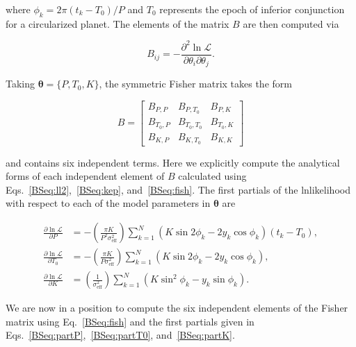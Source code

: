 \noindent where $\phi_k = 2\pi (t_k-T_0) / P$ and $T_0$ represents the epoch of inferior
conjunction for a circularized planet. The elements of the matrix $B$ are then computed via

\begin{equation}
  B_{ij} = -\frac{\partial^2 \ln{\mathcal{L}}}{\partial \theta_i \partial \theta_j}.
  \label{BSeq:fish}
\end{equation}

\noindent Taking $\boldsymbol{\theta}=\{P,T_0,K\}$, the symmetric Fisher matrix takes the
form

\begin{equation}
  B =
 \begin{bmatrix}
   B_{P,P} & B_{P,T_0} & B_{P,K} \\
   B_{T_0,P} & B_{T_0,T_0} & B_{T_0,K} \\
   B_{K,P} & B_{K,T_0} & B_{K,K} 
 \end{bmatrix} \label{BSeq:B}
\end{equation}

\noindent and contains six independent terms.
Here we explicitly compute the analytical forms of each independent element of $B$
calculated using Eqs.~\ref{BSeq:ll2},~\ref{BSeq:kep}, and~\ref{BSeq:fish}. The first partials
of the lnlikelihood with respect to each of the model parameters in $\boldsymbol{\theta}$ are

\begin{align}
  \frac{\partial \ln{\mathcal{L}}}{\partial P} &=
  -\left( \frac{\pi K}{P^2 \sigma_{\text{eff}}^2} \right) \sum_{k=1}^{N} (K \sin{2\phi_k} - 2y_k \cos{\phi_k}) (t_k-T_0), \label{BSeq:partP} \\
  \frac{\partial \ln{\mathcal{L}}}{\partial T_0} &=
  -\left( \frac{\pi K}{P \sigma_{\text{eff}}^2} \right) \sum_{k=1}^{N} (K \sin{2\phi_k} - 2y_k \cos{\phi_k}), \label{BSeq:partT0} \\
  \frac{\partial \ln{\mathcal{L}}}{\partial K} &=
  \left( \frac{1}{\sigma_{\text{eff}}^2} \right) \sum_{k=1}^{N} \left( K\sin^2{\phi_k} - y_k\sin{\phi_k}  \right). \label{BSeq:partK}
\end{align}

\noindent We are now in a position to compute the six independent elements of the Fisher matrix using Eq.~\ref{BSeq:fish}
and the first partials given in Eqs.~\ref{BSeq:partP},~\ref{BSeq:partT0}, and~\ref{BSeq:partK}.

